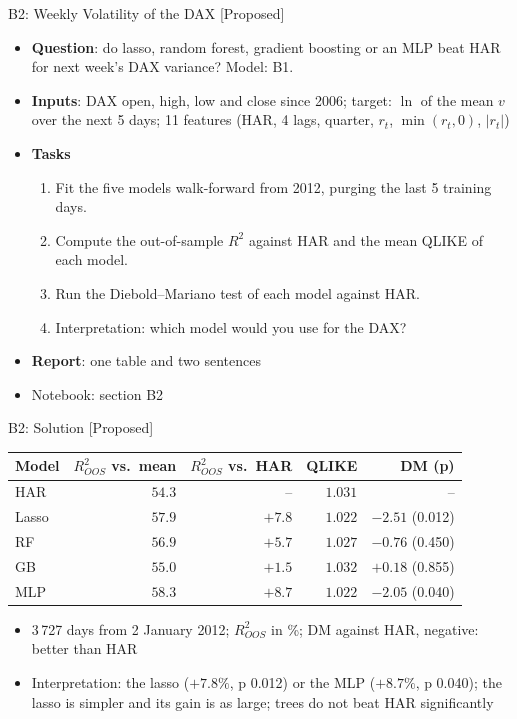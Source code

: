 \begin{frame}{B2: Weekly Volatility of the DAX [Proposed]}
\itemsize{\footnotesize}
\begin{itemize}
\item \textbf{Question}: do lasso, random forest, gradient boosting or an MLP beat HAR for next week's DAX variance? Model: B1.
\item \textbf{Inputs}: DAX open, high, low and close since 2006; target: $\ln$ of the mean $v$ over the next 5 days; 11 features (HAR, 4 lags, quarter, $r_t$, $\min(r_t, 0)$, $|r_t|$)
\item \textbf{Tasks}
\begin{enumerate}
    \item Fit the five models walk-forward from 2012, purging the last 5 training days.
    \item Compute the out-of-sample $R^2$ against HAR and the mean QLIKE of each model.
    \item Run the Diebold--Mariano test of each model against HAR.
    \item Interpretation: which model would you use for the DAX?
\end{enumerate}
\item \textbf{Report}: one table and two sentences
\item Notebook: section B2
\end{itemize}
\end{frame}

\ifsolutions
\begin{frame}{B2: Solution [Proposed]}
\itemsize{\footnotesize}
\begin{center}
\footnotesize
\begin{tabular}{lrrrr}
\toprule
Model & $R^2_{OOS}$ vs.\ mean & $R^2_{OOS}$ vs.\ HAR & QLIKE & DM (p) \\
\midrule
HAR & $54.3$ & -- & $1.031$ & -- \\
Lasso & $57.9$ & ${+7.8}$ & $1.022$ & ${-2.51}$ (0.012) \\
RF & $56.9$ & ${+5.7}$ & $1.027$ & ${-0.76}$ (0.450) \\
GB & $55.0$ & ${+1.5}$ & $1.032$ & ${+0.18}$ (0.855) \\
MLP & $58.3$ & ${+8.7}$ & $1.022$ & ${-2.05}$ (0.040) \\
\bottomrule
\end{tabular}
\end{center}
\begin{itemize}
    \item 3\,727 days from 2 January 2012; $R^2_{OOS}$ in \%; DM against HAR, negative: better than HAR
    \item Interpretation: the lasso ($+7.8\%$, p 0.012) or the MLP ($+8.7\%$, p 0.040); the lasso is simpler and its gain is as large; trees do not beat HAR significantly
\end{itemize}
\end{frame}
\fi

